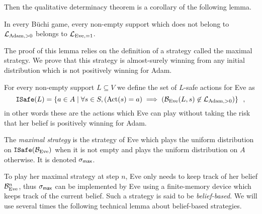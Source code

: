 Then the qualitative determinacy theorem is a corollary of the following lemma.
\begin{lemma}
In every B\"uchi game, every non-empty support
which does not belong to $\mathcal{L}_{\text{Adam},>0}$ belongs to $\mathcal{L}_{\text{Eve},=1}$.
\end{lemma}

The proof of this lemma relies on the definition of a strategy
called the maximal strategy.
We prove that this strategy is almost-surely winning from any initial
distribution which is not positively winning for Adam. 

\begin{definition}\label{def:maximalstrategy}
For every non-empty support $L\subseteq V$ we define
 the set  of {$L$-safe} actions for Eve as
\[
{\tt ISafe}(L) = \left\{ a \in A \mid  \forall s \in S, (\text{Act}(s)=a) \implies (\mathcal{B}_{\text{Eve}}(L,s)\not\in\mathcal{L}_{\text{Adam},>0}
  )\right\}\enspace,
\]
in other words these are the actions which Eve can play without taking the risk
that her belief is positively winning for Adam.

The \emph{maximal strategy} is the strategy of Eve
which plays the uniform distribution
on ${\tt ISafe}(\mathcal{B}_{\text{Eve}})$
when it is not empty and plays the uniform distribution on $A$ otherwise.
It is denoted $\sigma_{\textsf{max}}$.

\end{definition}

To play her maximal strategy at step $n$,
Eve only needs to keep track of her belief $\mathcal{B}_{\text{Eve}}^n$,
thus $\sigma_{\textsf{max}}$ can be implemented by Eve 
using a finite-memory device which keeps track of the current belief.
Such a strategy is said to be \emph{belief-based}.
We will use several times  the following technical lemma about belief-based strategies.

